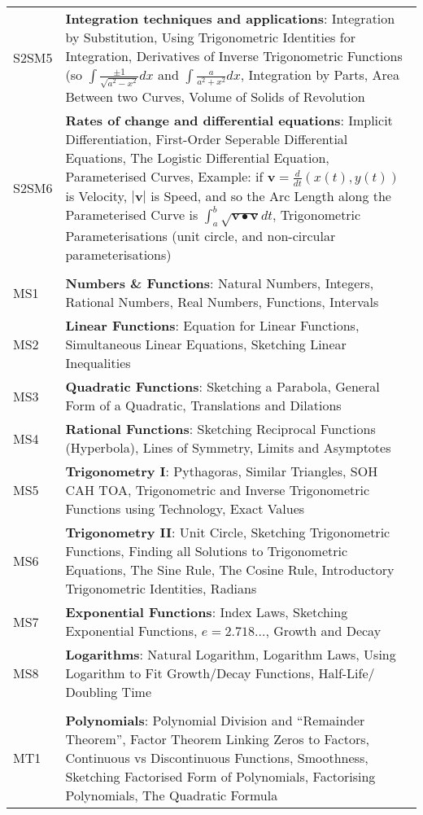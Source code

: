 \documentclass[varwidth=144mm, 12pt]{standalone}
\begin{document}
\begin{longtable}{lp{}}
S2SM5 & \textbf{Integration techniques and applications}: Integration by Substitution, Using Trigonometric Identities for Integration, Derivatives of Inverse Trigonometric Functions (so $\int{\frac{\pm1}{\sqrt{a^2-x^2}}dx}$ and $\int{\frac{a}{a^2+x^2}dx}$, Integration by Parts, Area Between two Curves, Volume of Solids of Revolution \\
S2SM6 & \textbf{Rates of change and differential equations}: Implicit Differentiation, First-Order Seperable Differential Equations, The Logistic Differential Equation, Parameterised Curves, Example: if $\mathbf{v} = \frac{d}{dt}(x(t),y(t))$ is Velocity, $|\mathbf{v}|$ is Speed, and so the Arc Length along the Parameterised Curve is $\int_a^b{\sqrt{\mathbf{v} \bullet \mathbf{v}}dt}$, Trigonometric Parameterisations (unit circle, and non-circular parameterisations) \\
& \\
MS1 & \textbf{Numbers \& Functions}: Natural Numbers, Integers, Rational Numbers, Real Numbers, Functions, Intervals \\
MS2 & \textbf{Linear Functions}: Equation for Linear Functions, Simultaneous Linear Equations, Sketching Linear Inequalities \\
MS3 & \textbf{Quadratic Functions}: Sketching a Parabola, General Form of a Quadratic, Translations and Dilations \\
MS4 & \textbf{Rational Functions}: Sketching Reciprocal Functions (Hyperbola), Lines of Symmetry, Limits and Asymptotes \\
MS5 & \textbf{Trigonometry I}: Pythagoras, Similar Triangles, SOH CAH TOA, Trigonometric and Inverse Trigonometric Functions using Technology, Exact Values\\
MS6 & \textbf{Trigonometry II}: Unit Circle, Sketching Trigonometric Functions, Finding all Solutions to Trigonometric Equations, The Sine Rule, The Cosine Rule, Introductory Trigonometric Identities, Radians \\
MS7 & \textbf{Exponential Functions}: Index Laws, Sketching Exponential Functions, $e = 2.718\hdots$, Growth and Decay\\
MS8 & \textbf{Logarithms}: Natural Logarithm, Logarithm Laws, Using Logarithm to Fit Growth/Decay Functions, Half-Life/ Doubling Time\\
& \\
MT1 & \textbf{Polynomials}: Polynomial Division and ``Remainder Theorem'', Factor Theorem Linking Zeros to Factors, Continuous vs Discontinuous Functions, Smoothness, Sketching Factorised Form of Polynomials, Factorising Polynomials, The Quadratic Formula \\

\end{longtable}
\end{document}
